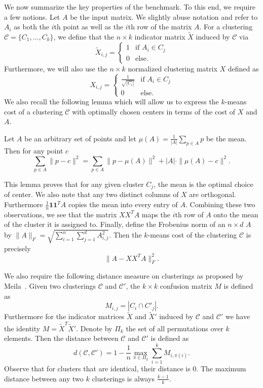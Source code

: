 We now summarize the key properties of the benchmark.
To this end, we require a few notions.
Let $A$ be the input matrix. We slightly abuse notation and refer to $A_i$ as both the $i$th point as well as the $i$th row of the matrix $A$.
For a clustering $\mathcal{C}=\{C_1,\ldots ,C_k\}$, we define that the $n\times k$ indicator matrix $\tilde X$ induced by $\mathcal{C}$ via
$$ \tilde X_{i,j} = \begin{cases}1 & \text{if } A_i\in C_j \\
0 & \text{else.} \end{cases}$$
Furthermore, we will also use the $n\times k$ normalized clustering matrix $ X$ defined as
$$ X_{i,j} = \begin{cases}\frac{1}{\sqrt{|C_i|}} & \text{if } A_i\in C_j \\
0 & \text{else.} \end{cases}$$
We also recall the following lemma which will allow us to express the $k$-means cost of a clustering $\mathcal{C}$ with optimally chosen centers in terms of the cost of $X$ and $A$.
\begin{lemma}[Folklore]
\label{lem:magic}
Let $A$ be an arbitrary set of points and let $\mu(A) = \frac{1}{|A|}\sum_{p\in A} p$ be the mean. Then for any point $c$
$$ \sum_{p\in A} \|p-c\|^2 = \sum_{p\in A} \|p-\mu(A)\|^2 + |A|\cdot \|\mu(A)-c\|^2.$$
\end{lemma}
This lemma proves that for any given cluster $C_j$, the mean is the optimal choice of center. 
We also note that any two distinct columns of $X$ are orthogonal. Furthermore $\frac{1}{n}\mathbf{1}\mathbf{1}^TA$ copies the mean into every entry of $A$. Combining these two observations, we see that the matrix $XX^TA$ maps the $i$th row of $A$ onto the mean of the cluster it is assigned to. Finally, define the Frobenius norm of an $n\times d$ $A$ by $\|A\|_F = \sqrt{\sum_{i=1}^n\sum_{j=1}^d A_{i,j}^2}$. Then the $k$-means cost of the clustering $\mathcal{C}$ is precisely
$$\|A-XX^TA\|_F^2.$$

We also require the following distance measure on clusterings as proposed by Meila~\cite{Meila05,Meila06}. Given two clusterings $\mathcal{C}$ and $\mathcal{C'}$, the $k\times k$ confusion matrix $M$ is defined as
$$ M_{i,j} = |C_i\cap C'_j|.$$
Furthermore for the indicator matrices $\tilde X$ and $\tilde X'$ induced by $\mathcal{C}$ and $\mathcal{C'}$ we have the identity $M=\tilde X^T {\tilde X'}$.
Denote by $\Pi_k$ the set of all permutations over $k$ elements. Then the distance between  $\mathcal{C}$ and $\mathcal{C'}$ is defined as
$$d(\mathcal{C},\mathcal{C'}) = 1-\frac{1}{n}\underset{\pi\in \Pi_k}{\max} \sum_{i=1}^k M_{i,\pi(i)}.$$
Observe that for clusters that are identical, their distance is $0$. The maximum distance between any two $k$ clusterings is always $\frac{k-1}{k}$.


